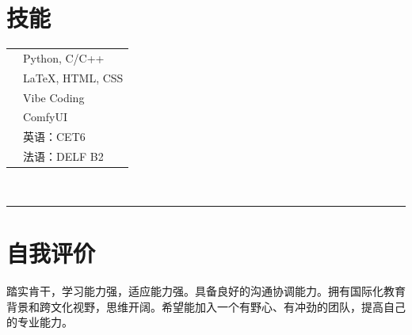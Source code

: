 \documentclass[UTF8]{article}
\begin{document}
{\begin{minipage}[t][\textheight-2\fboxsep-2\fboxrule][t]{\dimexpr0.40\textwidth-2\fboxrule-2\fboxsep\relax}
        \section*{\large 技能}
        \vspace{-0.5cm}
        \begin{tabularx}{\textwidth}{cY}
            \faCode{}        & Python, C/C++\\
            \faPen*{}        & \LaTeX, HTML, CSS\\
            \faCode{}        & Vibe Coding\\
            \faCogs{}        & ComfyUI\\
            \faLanguage{}    & 英语：CET6 \\
            \faLanguage{}    & 法语：DELF B2 \\
        \end{tabularx}
        \vspace{1pt} \\
        \rule{\linewidth}{0.4pt}
        \section*{\large 自我评价}
        踏实肯干，学习能力强，适应能力强。具备良好的沟通协调能力。拥有国际化教育背景和跨文化视野，思维开阔。希望能加入一个有野心、有冲劲的团队，提高自己的专业能力。
    \end{minipage}
}
\hfill
\end{document}
